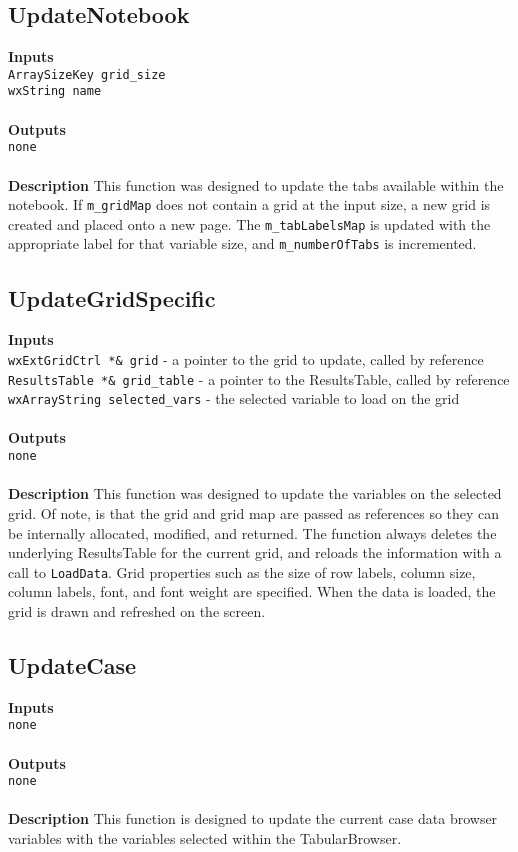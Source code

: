 \documentclass[11pt]{article} %
\begin{document}
\subsection{UpdateNotebook}
\textbf{Inputs} \\
\texttt{ArraySizeKey grid\_size} \\
\texttt{wxString name} \\
\\
\textbf{Outputs}\\
\texttt{none} \\
\\
\textbf{Description}
This function was designed to update the tabs available within the notebook.  If \texttt{m\_gridMap} does not contain a grid at the input size, a new grid is created and placed onto a new page.  The \texttt{m\_tabLabelsMap} is updated with the appropriate label for that variable size, and \texttt{m\_numberOfTabs} is incremented.

\subsection{UpdateGridSpecific}
\textbf{Inputs} \\
\texttt{wxExtGridCtrl *\& grid} - a pointer to the grid to update, called by reference \\
\texttt{ResultsTable *\& grid\_table} - a pointer to the ResultsTable, called by reference  \\
\texttt{wxArrayString selected\_vars} - the selected variable to load on the grid \\
\\
\textbf{Outputs}\\
\texttt{none} \\
\\
\textbf{Description}
This function was designed to update the variables on the selected grid. Of note, is that the grid and grid map are passed as references so they can be internally allocated, modified, and returned.  The function always deletes the underlying ResultsTable for the current grid, and reloads the information with a call to \texttt{LoadData}.  Grid properties such as the size of row labels, column size, column labels, font, and font weight are specified.  When the data is loaded, the grid is drawn and refreshed on the screen.

\subsection{UpdateCase}
\textbf{Inputs} \\
\texttt{none} \\
\\
\textbf{Outputs}\\
\texttt{none} \\
\\
\textbf{Description}
This function is designed to update the current case data browser variables with the variables selected within the TabularBrowser.  
\end{document}
